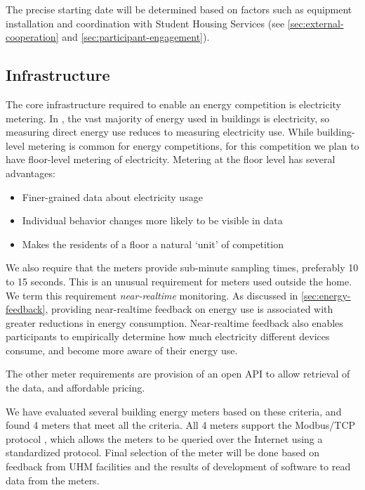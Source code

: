 The precise starting date will be determined based on factors such as equipment installation and coordination with Student Housing Services (see \autoref{sec:external-cooperation} and \autoref{sec:participant-engagement}).

\subsection{Infrastructure}

The core infrastructure required to enable an energy competition is electricity metering. In \Hawaii, the vast majority of energy used in buildings is electricity, so measuring direct energy use reduces to measuring electricity use. While building-level metering is common for energy competitions, for this competition we plan to have floor-level metering of electricity. Metering at the floor level has several advantages:

\begin{itemize}
	\item Finer-grained data about electricity usage
	\item Individual behavior changes more likely to be visible in data
	\item Makes the residents of a floor a natural `unit' of competition
\end{itemize}

We also require that the meters provide sub-minute sampling times, preferably 10 to 15 seconds. This is an unusual requirement for meters used outside the home. We term this requirement \emph{near-realtime} monitoring. As discussed in \autoref{sec:energy-feedback}, providing near-realtime feedback on energy use is associated with greater reductions in energy consumption. Near-realtime feedback also enables participants to empirically determine how much electricity different devices consume, and become more aware of their energy use.

The other meter requirements are provision of an open API to allow retrieval of the data, and affordable pricing.

We have evaluated several building energy meters based on these criteria, and found 4 meters that meet all the criteria. All 4 meters support the Modbus/TCP protocol \cite{modbus-website}, which allows the meters to be queried over the Internet using a standardized protocol. Final selection of the meter will be done based on feedback from UHM facilities and the results of development of software to read data from the meters.

